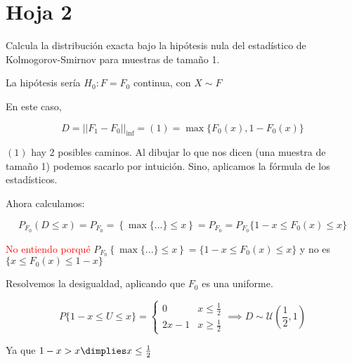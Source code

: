 
\section{Hoja 2}


\begin{problem}[1] Calcula la distribución exacta bajo la hipótesis nula del estadístico de Kolmogorov-Smirnov para muestras de tamaño 1.

\solution



La hipótesis sería $H_0 : F = F_0$ continua, con $X \sim F$

En este caso,

\[D=||F_1 - F_0||_{\inf} = (1) = \max\{F_0(x), 1 - F_0(x)\}\]

$(1)$ hay 2 posibles caminos. Al dibujar lo que nos dicen (una muestra de tamaño 1) podemos sacarlo por intuición. Sino, aplicamos la fórmula de los estadísticos.

Ahora calculamos:

\[ P_{F_0}(D\leq x) = P_{F_0} = \left\{\max \{ ... \}\leq x\right\} = P_{F_0} = P_{F_0}\{ 1-x \leq F_0(x) \leq x \}\]

\textcolor{red}{No entiendo porqué } $P_{F_0} \left\{\max \{ ... \}\leq x\right\} = \{ 1-x \leq F_0(x) \leq x \}$ y no es $\{ x \leq F_0(x) \leq 1-x \}$

Resolvemos la desigualdad, aplicando que $F_0$ es una uniforme.

\[
P\{1-x \leq U \leq x\} = \left\{ \begin{array}{cc} 0 & x\leq \frac{1}{2} \\ 2x-1 & x\geq \frac{1}{2}\end{array} \right. \implies D \sim \mathcal{U}\left(\frac{1}{2},1\right)
\]

Ya que $1-x > x \dimplies x\le \frac{1}{2}$

\end{problem}

